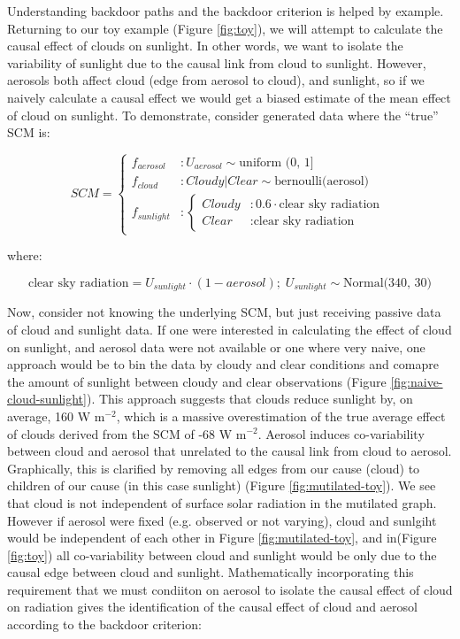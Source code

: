 \documentclass[12pt]{article}
\begin{document}
Understanding backdoor paths and the backdoor criterion is helped by
example. Returning to our toy example (Figure \ref{fig:toy}), we will
attempt to calculate the causal effect of clouds on sunlight. In other
words, we want to isolate the variability of sunlight due to the
causal link from cloud to sunlight. However, aerosols both affect
cloud (edge from aerosol to cloud), and sunlight, so if we naively
calculate a causal effect we would get a biased estimate of the mean
effect of cloud on sunlight. To demonstrate, consider generated
data where the ``true'' SCM is:

\begin{equation}
  SCM =
  \begin{cases}
    f_{aerosol} &: U_{aerosol} \sim \text{uniform (0, 1]}\\
    f_{cloud} &: Cloudy | Clear \sim \text{bernoulli(aerosol)}     \\
    f_{sunlight} &: \begin{cases}
      Cloudy &: 0.6 \cdot \text{clear sky radiation}  \\
      Clear &: \text{clear sky radiation}
    \end{cases}
  \end{cases}
\end{equation}

where:

\begin{equation*}
  \text{clear sky radiation} = U_{sunlight} \cdot (1 - aerosol); \;
  U_{sunlight} \sim \text{Normal(340, 30)}
\end{equation*}

Now, consider not knowing the underlying SCM, but just receiving
passive data of cloud and sunlight data. If one were interested in
calculating the effect of cloud on sunlight, and aerosol data were not
available or one where very naive, one approach would be to bin the
data by cloudy and clear conditions and comapre the amount of sunlight
between cloudy and clear observations (Figure
\ref{fig:naive-cloud-sunlight}). This approach suggests that clouds
reduce sunlight by, on average, 160 W m$^{-2}$, which is a massive
overestimation of the true average effect of clouds derived from the
SCM of -68 W m$^{-2}$. Aerosol induces co-variability between cloud
and aerosol that unrelated to the causal link from cloud to
aerosol. Graphically, this is clarified by removing all edges from our
cause (cloud) to children of our cause (in this case sunlight) (Figure
\ref{fig:mutilated-toy}). We see that cloud is not independent of
surface solar radiation in the mutilated graph.  However if aerosol
were fixed (e.g. observed or not varying), cloud and sunlgiht would be
independent of each other in Figure \ref{fig:mutilated-toy}, and
in(Figure \ref{fig:toy}) all co-variability between cloud and sunlight
would be only due to the causal edge between cloud and sunlight.
Mathematically incorporating this requirement that we must condiiton
on aerosol to isolate the causal effect of cloud on radiation gives
the identification of the causal effect of cloud and aerosol according
to the backdoor criterion:
\end{document}
